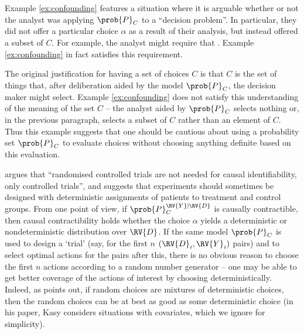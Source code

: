 Example \ref{ex:confounding} features a situation where it is arguable whether or not the analyst was applying $\prob{P}_C$ to a ``decision problem''. In particular, they did not offer a particular choice $\alpha$ as a result of their analysis, but instead offered a subset of $C$. For example, the analyst might require that . Example \ref{ex:confounding} in fact satisfies this requirement.

The original justification for having a set of choices $C$ is that $C$ is the set of things that, after deliberation aided by the model $\prob{P}_C$, the decision maker might select. Example \ref{ex:confounding} does not satisfy this understanding of the meaning of the set $C$ -- the analyst aided by $\prob{P}_C$ selects nothing or, in the previous paragraph, selects a subset of $C$ rather than an element of $C$. Thus this example suggests that one should be cautious about using a probability set $\prob{P}_C$ to evaluate choices without choosing anything definite based on this evaluation.

\citet{kasy_why_2016} argues that ``randomised controlled trials are not needed for causal identifiability, only controlled trials'', and suggests that experiments should sometimes be designed with deterministic assignments of patients to treatment and control groups. From one point of view, if $\prob{P}_C^{\RV{Y}|\RV{D}}$ is causally contractible, then causal contractibility holds whether the choice $\alpha$ yields a deterministic or nondeterministic distribution over $\RV{D}$. If the same model $\prob{P}_C$ is used to design a `trial' (say, for the first $n$ $(\RV{D}_i,\RV{Y}_i)$ pairs) and to select optimal actions for the pairs after this, there is no obvious reason to choose the first $n$ actions according to a random number generator -- one may be able to get better coverage of the actions of interest by choosing deterministically. Indeed, as \citet{kasy_why_2016} points out, if random choices are mixtures of deterministic choices, then the random choices can be at best as good as some deterministic choice (in his paper, Kasy considers situations with covariates, which we ignore for simplicity). 

